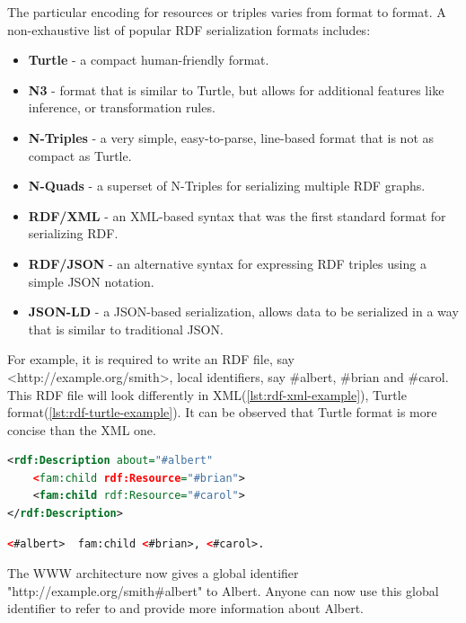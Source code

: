 \documentclass[thesis=M,english,hidelinks]{FITthesis}[2019/12/23]
\begin{document}
The particular encoding for resources or triples varies from format to format. A non-exhaustive list of popular \gls{RDF} serialization formats includes:
\begin{itemize}
	\item \textbf{Turtle} - a compact human-friendly format.
	\item \textbf{N3} - format that is similar to Turtle, but allows for additional features like inference, or transformation rules.
	\item \textbf{N-Triples} - a very simple, easy-to-parse, line-based format that is not as compact as Turtle.
	\item \textbf{N-Quads} - a superset of N-Triples for serializing multiple \gls{RDF} graphs.
	\item \textbf{RDF/XML} - an XML-based syntax that was the first standard format for serializing RDF.
	\item \textbf{RDF/JSON} - an alternative syntax for expressing RDF triples using a simple JSON notation.
	\item \textbf{JSON-LD} - a JSON-based serialization, allows data to be serialized in a way that is similar to traditional JSON. 
\end{itemize}

For example, it is required to write an \gls{RDF} file,  say \textless http://example.org/smith\textgreater, local identifiers, say  \#albert, \#brian and \#carol.  This  \gls{RDF} file will look differently in \gls{XML}(\ref{lst:rdf-xml-example}), Turtle format(\ref{lst:rdf-turtle-example}). It can be observed that Turtle format is more concise than the \gls{XML} one.

\begin{lstlisting}[language=XML, caption=Example of RDF serialization in XML, label = {lst:rdf-xml-example}]
<rdf:Description about="#albert"
	<fam:child rdf:Resource="#brian">
	<fam:child rdf:Resource="#carol">
</rdf:Description>
\end{lstlisting}


\begin{lstlisting}[language=XML, caption=Example of RDF serialization in N3/Turtle, label = {lst:rdf-turtle-example}]
	<#albert>  fam:child <#brian>, <#carol>.
\end{lstlisting}

The \gls{WWW} architecture now gives a global identifier  "http://example.org/smith\#albert" to Albert. Anyone can now use this global identifier to refer to and provide more information about Albert.
\end{document}
